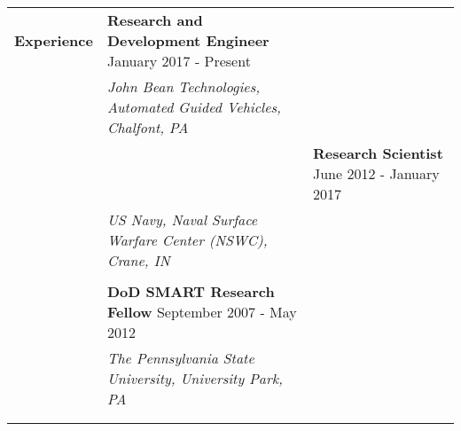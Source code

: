 \begin{tabular}{L{\hlcolw}  L{\rcolw}}
\textbf{\Large Experience} & \textbf{\large Research and Development Engineer} \hfill {\large January 2017 - Present}  \\
& \textit{\large John Bean Technologies, Automated Guided Vehicles, Chalfont, PA} \\ 
&
\vspace{-0.2in} 


& \textbf{\large Research Scientist} \hfill {\large June 2012 - January 2017}  \\
& \textit{\large US Navy, Naval Surface Warfare Center (NSWC), Crane, IN} \\ 
&
\vspace{-0.2in} 

\\

& \textbf{\large DoD SMART Research Fellow} \hfill {\large September 2007 - May 2012}  \\
& \textit{\large The Pennsylvania State University, University Park, PA} \\ 
& 
\vspace{-0.2in} 


\\
	\hline \\ 
\end{tabular}